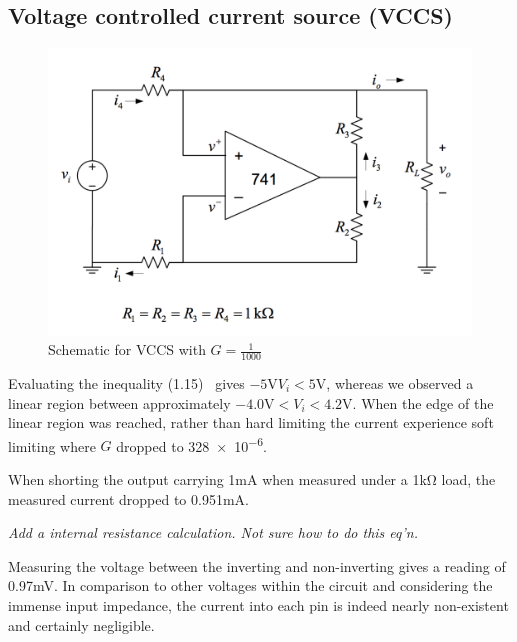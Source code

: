 \subsection{Voltage controlled current source (VCCS)}\label{sec:vccs}
\begin{figure}[tbph]
	\centering
	\includegraphics[width=0.7\linewidth]{graphics/vccs-schematic}
	\caption{Schematic for VCCS with $G = \frac{1}{1000}$}
	\label{fig:vccs-schematic}
\end{figure}

Evaluating the inequality (1.15)~\cite{lab-manual} gives $-5\si{\volt} V_i < 5\si{\volt}$, whereas we observed a linear region between approximately $-4.0\si{\volt}<V_i<4.2\si{\volt}$. When the edge of the linear region was reached, rather than hard limiting the current experience soft limiting where $G$ dropped to \num{328e-6}.

When shorting the output carrying 1\si{\milli\ampere} when measured under a 1\si{\kilo\ohm} load, the measured current dropped to 0.951\si{\milli\ampere}.

\large{\textit{Add a internal resistance calculation. Not sure how to do this eq'n.}}

Measuring the voltage between the inverting and non-inverting gives a reading of 0.97\si{\milli\volt}. In comparison to other voltages within the circuit and considering the immense input impedance, the current into each pin is indeed nearly non-existent and certainly negligible.

